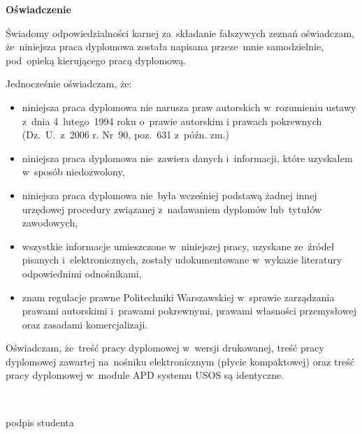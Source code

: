 \newpage\thispagestyle{empty}
  \begin{center}
  {\large\bfseries Oświadczenie}\par\bigskip
  \end{center}
  Świadomy odpowiedzialności karnej za~składanie fałszywych zeznań oświadczam, że~niniejsza praca dyplomowa została
  napisana przeze~mnie samodzielnie, pod~opieką kierującego pracą dyplomową.

  Jednocześnie oświadczam, że:
  \begin{itemize}
    \item niniejsza praca dyplomowa nie narusza praw autorskich w~rozumieniu ustawy z~dnia 4~lutego~1994 roku o~prawie
          autorskim i prawach pokrewnych (Dz.~U.~z~2006 r. Nr~90, poz.~631 z~późn. zm.)
    \item niniejsza praca dyplomowa nie~zawiera danych i~informacji, które uzyskałem w~sposób niedozwolony,
    \item niniejsza praca dyplomowa nie~była wcześniej podstawą żadnej innej urzędowej procedury związanej z~nadawaniem
          dyplomów lub~tytułów zawodowych,
    \item wszystkie informacje umieszczone w~niniejszej pracy, uzyskane ze~źródeł pisanych i~elektronicznych,
          zostały udokumentowane w~wykazie literatury odpowiednimi odnośnikami,
    \item znam regulacje prawne Politechniki Warszawskiej w~sprawie zarządzania prawami autorskimi i~prawami pokrewnymi,
          prawami własności przemysłowej oraz zasadami komercjalizaji.
  \end{itemize}

  Oświadczam, że~treść pracy dyplomowej w~wersji drukowanej, treść pracy dyplomowej zawartej na~nośniku elektronicznym
  (płycie kompaktowej) oraz treść pracy dyplomowej w~module APD systemu USOS są identyczne.

  \indent

  \hfill\parbox{15em}{{\small\dotfill}\\[-.3ex]
  \centerline{\footnotesize podpis studenta}}\par
